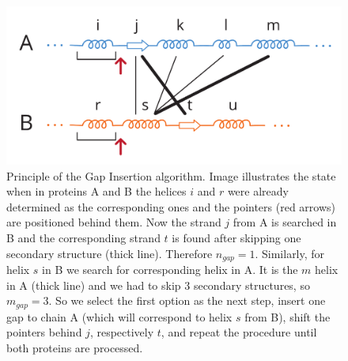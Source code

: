 \documentclass[twocolumn]{bmcart}%
\begin{document}
\begin{figure}[hbt]
  \centering
  \includegraphics[width=0.9\linewidth]{pics/first.pdf}
  \caption{Principle of the Gap Insertion algorithm. Image illustrates the state when in proteins A and B the helices $i$ and $r$ were already determined as the corresponding ones and the pointers (red arrows) are positioned behind them. Now the strand $j$ from A is searched in B and the corresponding strand $t$ is found after skipping one secondary structure (thick line). Therefore $n_{gap} = 1$. Similarly, for helix $s$ in B we search for corresponding helix in A. It is the $m$ helix in A (thick line) and we had to skip 3 secondary structures, so  $m_{gap} = 3$. So we select the first option as the next step, insert one gap to chain A (which will correspond to helix $s$ from B), shift the pointers behind $j$, respectively $t$, and repeat the procedure until both proteins are processed.}
  \label{fig:alg1}
\end{figure}
\end{document}
